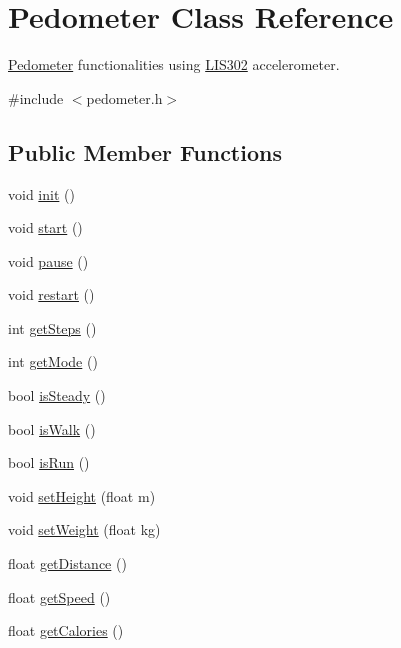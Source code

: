 \hypertarget{class_pedometer}{\section{Pedometer Class Reference}
\label{class_pedometer}
}


\hyperlink{class_pedometer}{Pedometer} functionalities using \hyperlink{class_l_i_s302}{L\-I\-S302} accelerometer.  




{\ttfamily \#include $<$pedometer.\-h$>$}

\subsection*{Public Member Functions}
\begin{DoxyCompactItemize}
\item 
void \hyperlink{class_pedometer_a8f0c7938e375751d3d34fdcb6c4880c6}{init} ()
\item 
void \hyperlink{class_pedometer_a6ba723efbe52177d23c41aa63d4f55d1}{start} ()
\item 
void \hyperlink{class_pedometer_a81c83bde8af270c3596ffc08f256cf65}{pause} ()
\item 
void \hyperlink{class_pedometer_ae9beddf74190d07ff611e21a9c490faa}{restart} ()
\item 
int \hyperlink{class_pedometer_a4d48e84820e8c2448d5147d1c7e2693a}{get\-Steps} ()
\item 
int \hyperlink{class_pedometer_a854089e4420736acb78b25d9ca037084}{get\-Mode} ()
\item 
bool \hyperlink{class_pedometer_ab1a681e46f1f0a157cf5cf2ebff5b609}{is\-Steady} ()
\item 
bool \hyperlink{class_pedometer_a1944eba109a4f2cd9d9948c0677627df}{is\-Walk} ()
\item 
bool \hyperlink{class_pedometer_ab2cadd5ca49b6e3ce1f844603fcf3a08}{is\-Run} ()
\item 
void \hyperlink{class_pedometer_a0f2085c2686f6acd824411a3cd75132f}{set\-Height} (float m)
\item 
void \hyperlink{class_pedometer_a25dd27f55bf919dcd7e7db0fa2b0aa1f}{set\-Weight} (float kg)
\item 
float \hyperlink{class_pedometer_a2120dca6727a59a76339ca2273841797}{get\-Distance} ()
\item 
float \hyperlink{class_pedometer_a2e2ce2a5ddb05410aa7e2c1eb0746da0}{get\-Speed} ()
\item 
float \hyperlink{class_pedometer_a6470da610c09e3ea71fa1b8a67351da1}{get\-Calories} ()
\end{DoxyCompactItemize}
